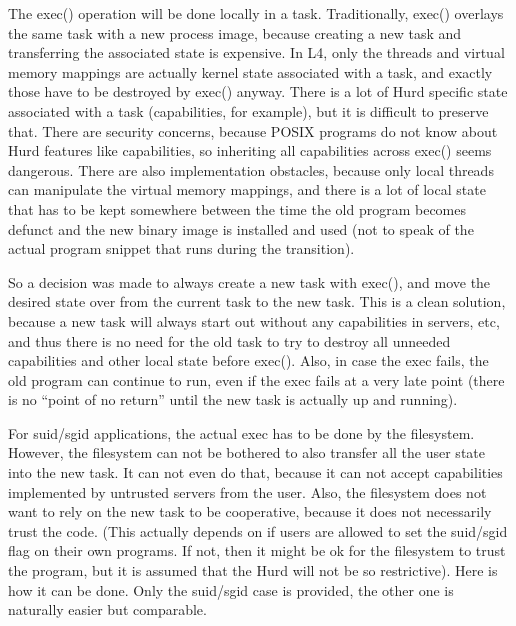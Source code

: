 \documentclass[9pt,a4paper]{extarticle}
\begin{document}
The exec() operation will be done locally in a task.  Traditionally,
exec() overlays the same task with a new process image, because
creating a new task and transferring the associated state is
expensive.  In L4, only the threads and virtual memory mappings are
actually kernel state associated with a task, and exactly those have
to be destroyed by exec() anyway.  There is a lot of Hurd specific
state associated with a task (capabilities, for example), but it is
difficult to preserve that.  There are security concerns, because
POSIX programs do not know about Hurd features like capabilities, so
inheriting all capabilities across exec() seems dangerous.  There are
also implementation obstacles, because only local threads can
manipulate the virtual memory mappings, and there is a lot of local
state that has to be kept somewhere between the time the old program
becomes defunct and the new binary image is installed and used (not to
speak of the actual program snippet that runs during the transition).

So a decision was made to always create a new task with exec(), and
move the desired state over from the current task to the new task.
This is a clean solution, because a new task will always start out
without any capabilities in servers, etc, and thus there is no need
for the old task to try to destroy all unneeded capabilities and other
local state before exec().  Also, in case the exec fails, the old
program can continue to run, even if the exec fails at a very late
point (there is no ``point of no return'' until the new task is
actually up and running).

For suid/sgid applications, the actual exec has to be done by the
filesystem.  However, the filesystem can not be bothered to also
transfer all the user state into the new task.  It can not even do
that, because it can not accept capabilities implemented by untrusted
servers from the user.  Also, the filesystem does not want to rely on
the new task to be cooperative, because it does not necessarily trust
the code.  (This actually depends on if users are allowed to set the
suid/sgid flag on their own programs.  If not, then it might be ok for
the filesystem to trust the program, but it is assumed that the Hurd
will not be so restrictive).  Here is how it can be done.  Only the
suid/sgid case is provided, the other one is naturally easier but
comparable.
\end{document}
